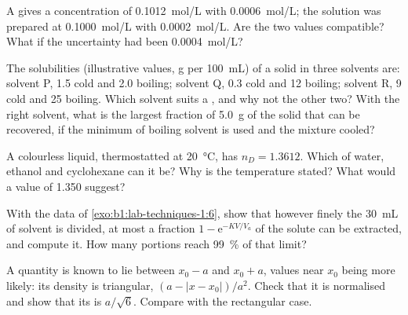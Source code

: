 \begin{exercise}[$\star\star$]\label{exo:b1:lab-techniques-1:7}
A  gives a concentration of \qty{0.1012}{mol/L} with  \qty{0.0006}{mol/L}; the solution was prepared at
\qty{0.1000}{mol/L} with  \qty{0.0002}{mol/L}. Are the
two values compatible? What if the  uncertainty had been
\qty{0.0004}{mol/L}?
\end{exercise}

\begin{exercise}[$\star\star$]\label{exo:b1:lab-techniques-1:8}
The solubilities (illustrative values, \unit{g} per \qty{100}{mL}) of a
solid in three solvents are: solvent P, 1.5 cold and 2.0 boiling; solvent
Q, 0.3 cold and 12 boiling; solvent R, 9 cold and 25 boiling. Which
solvent suits a , and why not the other two? With the
right solvent, what is the largest fraction of \qty{5.0}{g} of the solid
that can be recovered, if the minimum of boiling solvent is used and the
mixture cooled?
\end{exercise}

\begin{exercise}[$\star\star$]\label{exo:b1:lab-techniques-1:9}
A colourless liquid, thermostatted at \qty{20}{\celsius}, has
$n_D = 1.3612$. Which of water, ethanol and cyclohexane can it be? Why is
the temperature stated? What would a value of 1.350 suggest?
\end{exercise}

\begin{exercise}[$\star\star\star$]\label{exo:b1:lab-techniques-1:10}
With the data of \cref{exo:b1:lab-techniques-1:6}, show that however
finely the \qty{30}{mL} of solvent is divided, at most a fraction
$1 - \mathrm{e}^{-KV/V_a}$ of the solute can be extracted, and compute it.
How many portions reach \qty{99}{\percent} of that limit?
\end{exercise}

\begin{exercise}[$\star\star\star$]\label{exo:b1:lab-techniques-1:11}
A quantity is known to lie between $x_0 - a$ and $x_0 + a$, values near
$x_0$ being more likely: its density is triangular, $(a - |x - x_0|)/a^2$.
Check that it is normalised and show that its  is
$a/\sqrt6$. Compare with the rectangular case.
\end{exercise}

